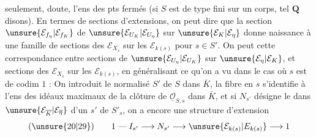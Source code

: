  seulement,  doute, l'ens des pts fermés (si $S$ est de type fini sur un corps, tel $\mathbf Q$ disons). En termes de sections d'extensions, on peut dire que la section $\unsure{\mathcal E_{f_\eta}|\mathcal E_{f_K}}$ de $\unsure{\mathcal E_{U_K}|\mathcal E_{U_\eta}}$ sur $\unsure{\mathcal E_K|\mathcal E_\eta}$ donne naissance à une famille de sections des $\mathcal E_{X_s}$ sur les $\mathcal E_{k(s)}$ pour $s\in S'$. On peut    cette correspondance entre sections de $\unsure{\mathcal E_{U_\eta}|\mathcal E_{U_K}}$ sur $\unsure{\mathcal E_\eta|\mathcal E_K}$, et sections des $\mathcal E_{X_s}$ sur les $\mathcal E_{k(s)}$, en généralisant ce qu'on a vu dans le cas où $s$ est de codim $1$ : On introduit le normalisé $S'$ de $S$ dans $\overline K$, la fibre en $s$ s'identifie à l'ens des idéaux maximaux de la clôture  de $\underline{\mathcal O}_{S,s}$ dans $\overline K$, et si $N_{s'}$ désigne le   dans $\unsure{\mathcal E_{\overline K}|\mathcal E_{\overline\eta}}$ d'un $s'$ de $S'_s$, on a encore une structure d'extension
\[
(\unsure{20|29})\qquad
1\mathrel{\text{---}}I_{s'}\longrightarrow N_{s'}\longrightarrow \unsure{\mathcal E_{k(s)}|E_{k(s)}}\longrightarrow 1
\]
